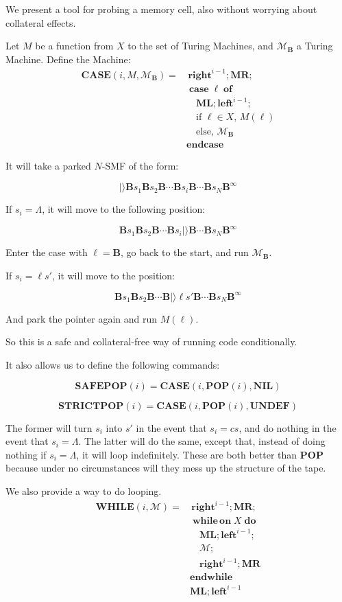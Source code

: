 \documentclass{article}
\newcommand{\B}{\mathbf{B}}
\newcommand{\M}{\mathcal{M}}
\DeclareMathOperator{\Nwhileon}{\mathbf{while\,on}}
\DeclareMathOperator{\Ndo}{\mathbf{do}}
\DeclareMathOperator{\Nendwhile}{\mathbf{endwhile}}
\DeclareMathOperator{\Ncase}{\mathbf{case}}
\DeclareMathOperator{\Nof}{\mathbf{of}}
\DeclareMathOperator{\Nendcase}{\mathbf{endcase}}
\newcommand{\NIL}{\mathbf{NIL}}
\newcommand{\MR}{\mathbf{MR}}
\newcommand{\ML}{\mathbf{ML}}
\newcommand{\UNDEF}{\mathbf{UNDEF}}
\newcommand{\Oright}{\mathbf{right}}
\newcommand{\Oleft}{\mathbf{left}}
\newcommand{\POP}{\mathbf{POP}}
\newcommand{\SAFEPOP}{\mathbf{SAFEPOP}}
\newcommand{\STRICTPOP}{\mathbf{STRICTPOP}}
\newcommand{\CASE}{\mathbf{CASE}}
\newcommand{\WHILE}{\mathbf{WHILE}}
\begin{document}
	We present a tool for probing a memory cell, also without worrying about collateral effects.
	
	Let $M$ be a function from $X$ to the set of Turing Machines, and $\M_\B$ a Turing Machine. Define the Machine:
	\begin{align*}
	\CASE(i, M, \M_\B) =& \,\Oright^{i-1}; \MR;\\
	&\Ncase \ell \Nof\\
	&\quad \ML; \Oleft^{i-1};\\
	&\quad \text{if $\ell \in X$, } M(\ell)\\
	&\quad \text{else, } \M_\B\\
	&\Nendcase
	\end{align*}
	
	It will take a parked $N$-SMF of the form:
	
	\[|\rangle \B s_1 \B s_2 \B \cdots \B s_i \B \cdots \B s_N \B^\infty\]
	
	If $s_i = \Lambda$, it will move to the following position:
	
	\[\B s_1 \B s_2 \B \cdots \B s_i |\rangle \B \cdots \B s_N \B^\infty\]
	
	Enter the case with $\ell = \B$, go back to the start, and run $\M_\B$.
	
	If $s_i = \ell s'$, it will move to the position:
	
	\[\B s_1 \B s_2 \B \cdots \B |\rangle \ell s' \B \cdots \B s_N \B^\infty\]
	
	And park the pointer again and run $M(\ell)$.
	
	So this is a safe and collateral-free way of running code conditionally.
	
	It also allows us to define the following commands:
	
	\[\SAFEPOP(i) = \CASE(i, \POP(i), \NIL)\]
	
	\[\STRICTPOP(i) = \CASE(i, \POP(i), \UNDEF)\]
	
	The former will turn $s_i$ into $s'$ in the event that $s_i = c s$, and do nothing in the event that $s_i = \Lambda$. The latter will do the same, except that, instead of doing nothing if $s_i = \Lambda$, it will loop indefinitely. These are both better than $\POP$ because under no circumstances will they mess up the structure of the tape.
	
	We also provide a way to do looping.
	\begin{align*}
	\WHILE(i, \M) =& \,\Oright^{i-1}; \MR;\\
	&\Nwhileon X \Ndo\\
	&\quad \ML; \Oleft^{i-1};\\
	&\quad \M;\\
	&\quad \Oright^{i-1}; \MR\\
	&\Nendwhile\\
	&\ML; \Oleft^{i-1}
	\end{align*}
	
\end{document}
